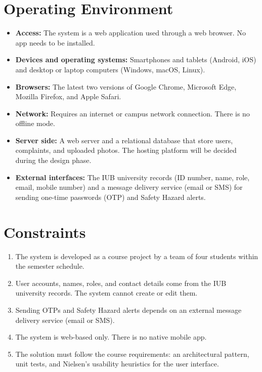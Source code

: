 \section{Operating Environment}
\begin{itemize}
  \item \textbf{Access:} The system is a web application used through a web browser. No app needs to be installed.
  \item \textbf{Devices and operating systems:} Smartphones and tablets (Android, iOS) and desktop or laptop computers (Windows, macOS, Linux).
  \item \textbf{Browsers:} The latest two versions of Google Chrome, Microsoft Edge, Mozilla Firefox, and Apple Safari.
  \item \textbf{Network:} Requires an internet or campus network connection. There is no offline mode.
  \item \textbf{Server side:} A web server and a relational database that store users, complaints, and uploaded photos. The hosting platform will be decided during the design phase.
  \item \textbf{External interfaces:} The IUB university records (ID number, name, role, email, mobile number) and a message delivery service (email or SMS) for sending one-time passwords (OTP) and Safety Hazard alerts.
\end{itemize}

\section{Constraints}
\begin{enumerate}
  \item The system is developed as a course project by a team of four students within the semester schedule.
  \item User accounts, names, roles, and contact details come from the IUB university records. The system cannot create or edit them.
  \item Sending OTPs and Safety Hazard alerts depends on an external message delivery service (email or SMS).
  \item The system is web-based only. There is no native mobile app.
  \item The solution must follow the course requirements: an architectural pattern, unit tests, and Nielsen's usability heuristics for the user interface.
\end{enumerate}

